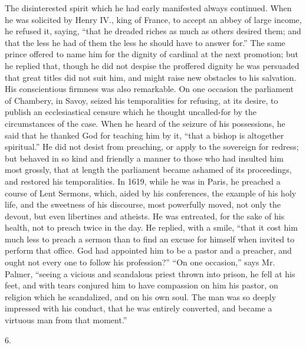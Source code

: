 The disinterested spirit which he had early manifested always
continued. When he was solicited by Henry IV., king of France, to
accept an abbey of large income, he refused it, saying, ``that he
dreaded riches as much as others desired them; and that the less he
had of them the less he should have to answer for.'' The same
prince offered to name him for the dignity of cardinal at the next
promotion; but he replied that, though he did not despise the
proffered dignity he was persuaded that great titles did not suit him,
and might raise new obstacles to his salvation. His conscientious
firmness was also remarkable. On one occasion the parliament of
Chambery, in Savoy, seized his temporalities for refusing, at its
desire, to publish an ecclesiastical censure which he thought
uncalled-for by the circumstances of the case. When he heard of the
seizure of his possessions, he said that he thanked God for teaching
him by it, ``that a bishop is altogether spiritual.'' He did
not desist from preaching, or apply to the sovereign for redress; but
behaved in so kind and friendly a manner to those who had insulted him
most grossly, that at length the parliament became ashamed of its
proceedings, and restored his temporalities. In 1619, while he was in
Paris, he preached a course of Lent Sermons, which, aided by his
conferences, the example of his holy life, and the sweetness of his
discourse, most powerfully moved, not only the devout, but even
libertines and atheists. He was entreated, for the sake of his health,
not to preach twice in the day. He replied, with a smile, ``that
it cost him much less to preach a sermon than to find an excuse for
himself when invited to perform that office. God had appointed him to
be a pastor and a preacher, and ought not every one to follow his
profession?'' ``On one occasion,'' says Mr. Palmer,
``seeing a vicious and scandalous priest thrown into prison, he
fell at his feet, and with tears conjured him to have compassion on
him his pastor, on religion which he scandalized, and on his own soul.
The man was so deeply impressed with his conduct, that he was entirely
converted, and became a virtuous man from that moment.''

6.

